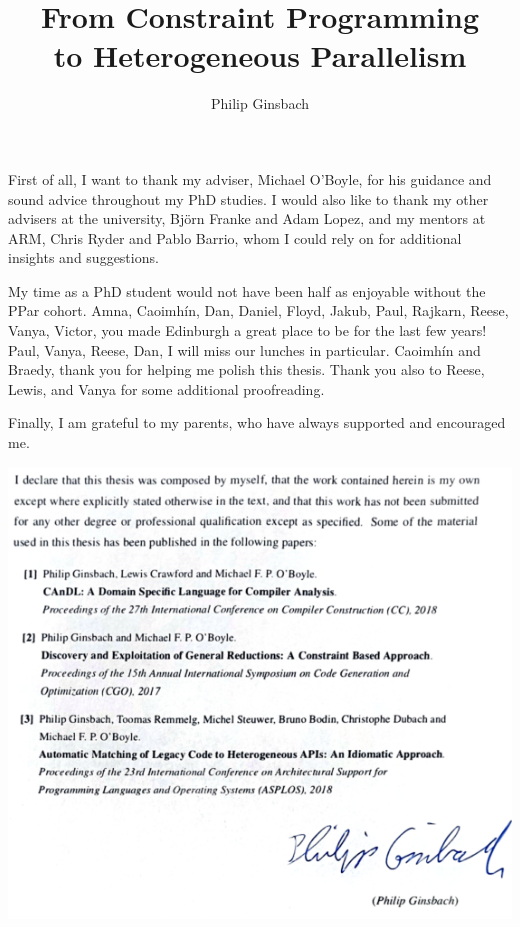 \documentclass[phd,icsa,twoside,logo,11pt]{infthesis}
\title{From Constraint Programming\\to Heterogeneous Parallelism}
\author{Philip Ginsbach}
\newenvironment{laysummary}
   {\renewcommand{\abstractname}{Lay Summary}\begin{mainabs}}
   {\end{mainabs}\renewcommand{\abstractname}{}{}}
\begin{document}
\abstract{}
\begin{preliminary}
\maketitle
\begin{abstract}

\end{abstract}
\begin{laysummary}

\end{laysummary}
\begin{acknowledgements}
    First of all, I want to thank my adviser, Michael O'Boyle, for his guidance
    and sound advice throughout my PhD studies.
    I would also like to thank my other advisers at the university,
    Björn Franke and Adam Lopez, and my mentors at ARM,
    Chris Ryder and Pablo Barrio, whom I could rely on for additional insights
    and suggestions.

    My time as a PhD student would not have been half as enjoyable without the
    PPar cohort.
    Amna, Caoimhín, Dan, Daniel, Floyd, Jakub, Paul, Rajkarn, Reese, Vanya,
    Victor, you made Edinburgh a great place to be for the last few years!
    Paul, Vanya, Reese, Dan, I will miss our lunches in particular.
    Caoimhín and Braedy, thank you for helping me polish this thesis.
    Thank you also to Reese, Lewis, and Vanya for some additional proofreading.

    Finally, I am grateful to my parents, who have always supported and
    encouraged me.

\end{acknowledgements}
\begin{declaration}

    \includegraphics[width=\columnwidth]{SignedDeclaration.pdf}

\textcolor{white}{
\citet{Ginsbach:2018:CDS:3178372.3179515}
\citet{ginsbach2017discovery}
\citet{Ginsbach:2018:AML:3173162.3173182}}

\end{declaration}
\tableofcontents
\end{preliminary}
\end{document}
